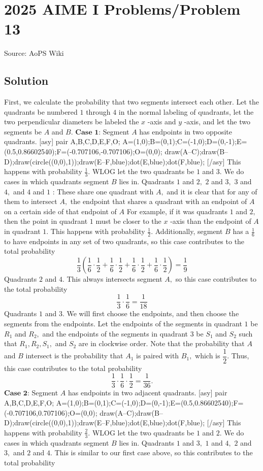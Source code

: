 \documentclass[12pt]{article}
\begin{document}
\section*{{2025 AIME I Problems/Problem 13}}
Source: AoPS Wiki

\subsection*{Solution}
First, we calculate the probability that two segments intersect each other. Let the quadrants be numbered $1$ through $4$ in the normal labeling of quadrants, let the two perpendicular diameters be labeled the $x$ -axis and $y$ -axis, and let the two segments be $A$ and $B.$ $\textbf{Case 1:}$ Segment $A$ has endpoints in two opposite quadrants. [asy] pair A,B,C,D,E,F,O; A=(1,0);B=(0,1);C=(-1,0);D=(0,-1);E=(0.5,0.86602540);F=(-0.707106,-0.707106);O=(0,0); draw(A--C);draw(B--D);draw(circle((0,0),1));draw(E--F,blue);dot(E,blue);dot(F,blue); [/asy] This happens with probability $\frac{1}{3}.$ WLOG let the two quadrants be $1$ and $3.$ We do cases in which quadrants segment $B$ lies in. Quadrants $1$ and $2,$ $2$ and $3,$ $3$ and $4,$ and $4$ and $1$ : These share one quadrant with $A,$ and it is clear that for any of them to intersect $A,$ the endpoint that shares a quadrant with an endpoint of $A$ on a certain side of that endpoint of $A$ For example, if it was quadrants $1$ and $2,$ then the point in quadrant $1$ must be closer to the $x$ -axis than the endpoint of $A$ in quadrant $1.$ This happens with probability $\frac{1}{2}.$ Additionally, segment $B$ has a $\frac{1}{6}$ to have endpoints in any set of two quadrants, so this case contributes to the total probability \[\dfrac{1}{3}\left(\dfrac{1}{6}\cdot\dfrac{1}{2}+\dfrac{1}{6}\cdot\dfrac{1}{2}+\dfrac{1}{6}\cdot\dfrac{1}{2}+\dfrac{1}{6}\cdot\dfrac{1}{2}\right)=\dfrac{1}{9}\] Quadrants $2$ and $4.$ This always intersects segment $A,$ so this case contributes to the total probability \[\dfrac{1}{3}\cdot\dfrac{1}{6}=\dfrac{1}{18}\] Quadrants $1$ and $3.$ We will first choose the endpoints, and then choose the segments from the endpoints. Let the endpoints of the segments in quadrant $1$ be $R_1$ and $R_2,$ and the endpoints of the segments in quadrant $3$ be $S_1$ and $S_2$ such that $R_1,R_2,S_1,$ and $S_2$ are in clockwise order. Note that the probability that $A$ and $B$ intersect is the probability that $A_1$ is paired with $B_1,$ which is $\dfrac{1}{2}.$ Thus, this case contributes to the total probability \[\dfrac{1}{3}\cdot\dfrac{1}{6}\cdot\dfrac{1}{2}=\dfrac{1}{36}.\] $\textbf{Case 2:}$ Segment $A$ has endpoints in two adjacent quadrants. [asy] pair A,B,C,D,E,F,O; A=(1,0);B=(0,1);C=(-1,0);D=(0,-1);E=(0.5,0.86602540);F=(-0.707106,0.707106);O=(0,0); draw(A--C);draw(B--D);draw(circle((0,0),1));draw(E--F,blue);dot(E,blue);dot(F,blue); [/asy] This happens with probability $\frac{2}{3}.$ WLOG let the two quadrants be $1$ and $2.$ We do cases in which quadrants segment $B$ lies in. Quadrants $1$ and $3,$ $1$ and $4,$ $2$ and $3,$ and $2$ and $4.$ This is similar to our first case above, so this contributes to the total probability 
\end{document}
